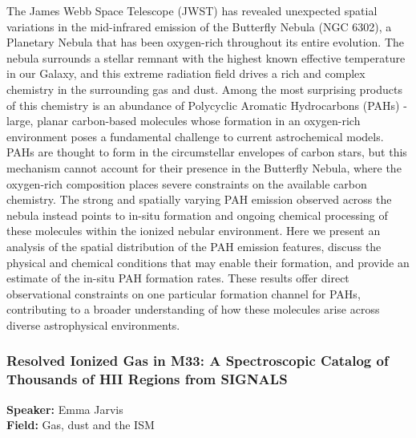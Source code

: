 The James Webb Space Telescope (JWST) has revealed unexpected spatial variations in the mid-infrared emission of the Butterfly Nebula (NGC 6302), a Planetary Nebula that has been oxygen-rich throughout its entire evolution. The nebula surrounds a stellar remnant with the highest known effective temperature in our Galaxy, and this extreme radiation field drives a rich and complex chemistry in the surrounding gas and dust. Among the most surprising products of this chemistry is an abundance of Polycyclic Aromatic Hydrocarbons (PAHs) - large, planar carbon-based molecules whose formation in an oxygen-rich environment poses a fundamental challenge to current astrochemical models. PAHs are thought to form in the circumstellar envelopes of carbon stars, but this mechanism cannot account for their presence in the Butterfly Nebula, where the oxygen-rich composition places severe constraints on the available carbon chemistry. The strong and spatially varying PAH emission observed across the nebula instead points to in-situ formation and ongoing chemical processing of these molecules within the ionized nebular environment. Here we present an analysis of the spatial distribution of the PAH emission features, discuss the physical and chemical conditions that may enable their formation, and provide an estimate of the in-situ PAH formation rates. These results offer direct observational constraints on one particular formation channel for PAHs, contributing to a broader understanding of how these molecules arise across diverse astrophysical environments.

\hypertarget{abstract-talk-154}{}\label{abstract-page-talk-154}
\subsubsection*{Resolved Ionized Gas in M33: A Spectroscopic Catalog of Thousands of HII Regions from SIGNALS}
\textbf{Speaker:} Emma Jarvis\\
\textbf{Field:} Gas, dust and the ISM

